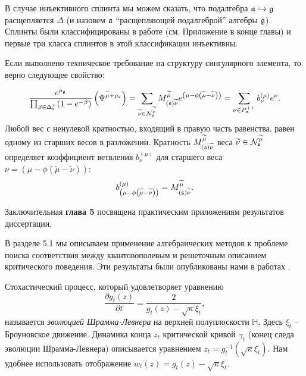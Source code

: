 \documentclass[14pt,autoref,href,facsimile
]{disser}
\begin{document}
В случае инъективного сплинта мы можем сказать, что подалгебра $\mathfrak{a}\hookrightarrow \mathfrak{g}$ расщепляется $\Delta$ (и назовем $\mathfrak{a}$ ``расщепляющей подалгеброй'' алгебры $\mathfrak{g}$).  Сплинты были классифицированы в работе \cite{richter2008splints}  (см. Приложение в конце главы) и первые три класса сплинтов в этой классификации инъективны. 

Если выполнено техническое требование на структуру сингулярного элемента, то верно следующее свойство:
\begin{Prop}
\begin{equation}
\frac{e^{\rho _{\gf}}}{\prod_{\beta \in \Delta _{\sfr%
}^{+}}(1-e^{-\beta })}\left( \Psi ^{\widetilde{\mu }+\rho _{\sfr%
}}\right) =\sum_{\widetilde{\nu }\in \mathcal{N}_{\sfr}^{\widetilde{\mu }%
}}M_{\left( \sfr\right) \widetilde{\nu }}^{\widetilde{\mu }}e^{\left(
\mu -\phi \left( \widetilde{\mu }-\widetilde{\nu }\right) \right)
}=\sum_{\nu \in P_{\af}^{++}}b_{\nu }^{(\mu )}e^{\nu }.
\label{singular main-4}
\end{equation}
Любой вес с ненулевой кратностью, входящий в правую часть равенства, равен одному из старших весов в разложении. Кратность $M_{\left( \mathfrak{s}
\right) \widetilde{\nu }}^{\widetilde{\mu }}$ веса  $\widetilde{\nu}\in \mathcal{N}_{\mathfrak{s}}^{\widetilde{\mu }}$ определяет коэффициент ветвления  $b_{\nu }^{(\mu )}$ для старшего веса $\nu =\left( \mu-\phi \left( \widetilde{\mu }-\widetilde{\nu }\right) \right) $:
\[
b_{\left( \mu -\phi \left( \widetilde{\mu }-\widetilde{\nu }\right) \right)
}^{(\mu )}=M_{\left( \mathfrak{s}\right) \widetilde{\nu }}^{\widetilde{\mu }}.
\]
\end{Prop}



Заключительная \textbf{глава 5} посвящена практическим приложениям результатов диссертации.

 В разделе 5.1 мы  описываем применение алгебраических методов к проблеме поиска соответствия между квантовополевым и решеточным описанием критического поведения. Эти результаты были опубликованы нами в работах .

Стохастический процесс, который удовлетворяет уравнению 
\begin{equation}
\label{eq:166}
  \frac{\partial g_t(z)}{\partial t} = \frac{ 2}{g_t(z)-\sqrt{\kappa}\xi_{t}} ,
\end{equation}
называется {\it эволюцией Шрамма-Левнера} на верхней полуплоскости $\mathbb{H}$. Здесь $\xi_{t}$ -- Броуновское движение. Динамика конца  $z_{t}$ критической кривой $\gamma_{t}$ (конец следа эволюции Шрамма-Левнера) описывается уравнением $z_{t}=g_{t}^{-1}(\sqrt{\kappa}\xi_{t})$. Нам удобнее использовать отображение $w_{t} (z)=g_{t}(z)-\sqrt{\kappa}\xi_{t}$. 
\end{document}
